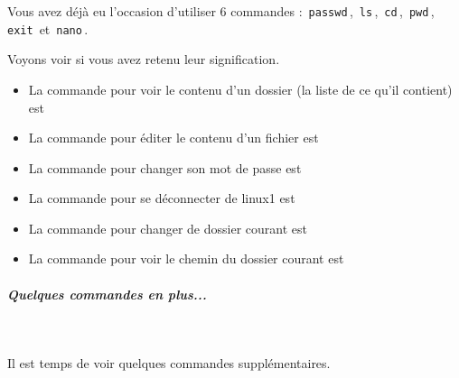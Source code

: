 \documentclass[11pt,a4paper]{article}
\begin{document}
							Vous avez d\'ej\`a eu l'occasion d'utiliser 6 commandes :
							\,\verb|passwd|\,,
							\,\verb|ls|\,,
							\,\verb|cd|\,,
							\,\verb|pwd|\,,
							\,\verb|exit|\, et
							\,\verb|nano|\,.
							
							Voyons voir si vous avez retenu leur signification.
						
					\begin{itemize}
				
			\item 
									La commande pour voir le contenu d'un dossier (la liste de ce qu'il contient) est
									 \textcolor{gray}{\underline{\hspace*{2em}}} 
			\item 
									La commande pour \'editer le contenu d'un fichier est
									 \textcolor{gray}{\underline{\hspace*{3em}}} 
			\item 
									La commande pour changer son mot de passe est
									 \textcolor{gray}{\underline{\hspace*{5em}}} 
			\item 
									La commande pour se d\'econnecter de linux1 est
									 \textcolor{gray}{\underline{\hspace*{3em}}} 
			\item 
									La commande pour changer de dossier courant est
									 \textcolor{gray}{\underline{\hspace*{2em}}} 
			\item 
									La commande pour voir le chemin du dossier courant est
									 \textcolor{gray}{\underline{\hspace*{2em}}} 
					\end{itemize}
				
			
		\subparagraph{Quelques commandes en plus...} 
		
					\textcolor{white}{.} \par
				
            \par
        
					Il est temps de voir quelques commandes suppl\'ementaires.
				
            \par
        
\end{document}
